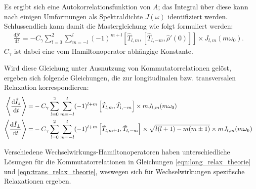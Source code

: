 Es ergibt sich eine Autokorrelationsfunktion von $A$; das Integral über diese kann nach einigen Umformungen als Spektraldichte $J(\omega)$ identifiziert werden. Schlussendlich kann damit die Mastergleichung wie folgt formuliert werden:
\begin{align}
    \frac{\text{d} \hat{\rho}'}{\text{d}t} = - C_\gamma \sum_{l = 0}^2 \sum_{m = -l}^l (-1)^{m+l} \left[\hat{T}_{l,m}, [\hat{T}_{l,-m}, \hat{\rho}'(0)] \right] \times J_{l,m}(m \omega_0).
\end{align}
$C_\gamma$ ist dabei eine vom Hamiltonoperator abhängige Konstante.

Wird diese Gleichung unter Ausnutzung von Kommutatorrelationen gelöst, ergeben sich folgende Gleichungen, die zur longitudinalen bzw. transversalen Relaxation korrespondieren:
\begin{align}
    \Braket{\frac{\text{d} \hat{I}_z}{\text{d}t}} =& - C_\gamma \sum_{l = 0}^2 \sum_{m = -l}^l (-1)^{l+m} \left[\hat{T}_{l,m}, \hat{T}_{l,-m}\right] \times m J_{l,m}(m \omega_0) \label{eqn:long_relax_theorie} \\
    \Braket{\frac{\text{d} \hat{I}_\pm}{\text{d}t}} =& - C_\gamma \sum_{l = 0}^2 \sum_{m = -l}^l (-1)^{l+m} \left[\hat{T}_{l,m \pm 1}, \hat{T}_{l,-m}\right] \times \sqrt{l(l+1) - m(m \pm 1)} \times m J_{l,m}(m \omega_0) \label{eqn:trans_relax_theorie}
\end{align}


Verschiedene Wechselwirkungs-Hamiltonoperatoren haben unterschiedliche Lösungen für die Kommutatorrelationen in Gleichungen \eqref{eqn:long_relax_theorie} und \eqref{eqn:trans_relax_theorie}, weswegen sich für Wechselwirkungen spezifische Relaxationen ergeben.




